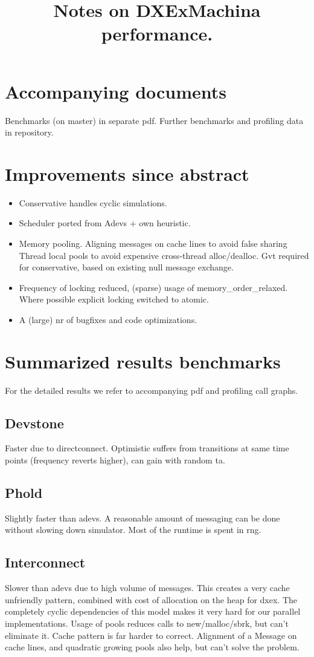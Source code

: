 \documentclass[]{article}
\title{Notes on DXExMachina performance.}
\author{}
\begin{document}
\maketitle
\section{Accompanying documents}
Benchmarks (on master) in separate pdf. Further benchmarks and profiling data in repository.

\section{Improvements since abstract}
\begin{itemize}
	\item Conservative handles cyclic simulations.
	\item Scheduler ported from Adevs + own heuristic.
	\item Memory pooling.
	\subitem Aligning messages on cache lines to avoid false sharing
	\subitem Thread local pools to avoid expensive cross-thread alloc/dealloc.
	\subitem Gvt required for conservative, based on existing null message exchange.
	\item Frequency of locking reduced, (sparse) usage of memory\_order\_relaxed. Where possible explicit	locking switched to atomic.
	\item A (large) nr of bugfixes and code optimizations.
\end{itemize}
\section{Summarized results benchmarks}
For the detailed results we refer to accompanying pdf and profiling call graphs.
\subsection{Devstone}
Faster due to directconnect. Optimistic suffers from transitions at same time points (frequency reverts higher), can gain with random ta.
\subsection{Phold}
Slightly faster than adevs. A reasonable amount of messaging can be done without slowing down simulator. Most of the runtime is spent in rng.
\subsection{Interconnect}
Slower than adevs due to high volume of messages. This creates a very cache unfriendly pattern, combined with cost of allocation on the heap for dxex. 
The completely cyclic dependencies of this model makes it very hard for our parallel implementations. Usage of pools reduces calls to new/malloc/sbrk, but can't eliminate it. Cache pattern is far harder to correct. Alignment of a Message on cache lines, and quadratic growing pools also help, but can't solve the problem.
\end{document}
